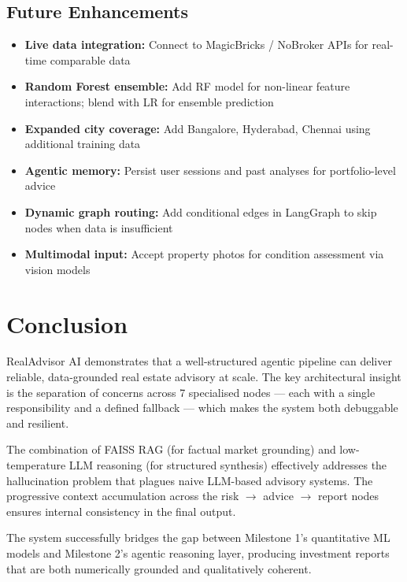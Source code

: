 \documentclass[12pt,a4paper]{article}
\begin{document}
\subsection{Future Enhancements}

\begin{itemize}[leftmargin=1.5em]
  \item \textbf{Live data integration:} Connect to MagicBricks / NoBroker APIs for real-time comparable data
  \item \textbf{Random Forest ensemble:} Add RF model for non-linear feature interactions; blend with LR for ensemble prediction
  \item \textbf{Expanded city coverage:} Add Bangalore, Hyderabad, Chennai using additional training data
  \item \textbf{Agentic memory:} Persist user sessions and past analyses for portfolio-level advice
  \item \textbf{Dynamic graph routing:} Add conditional edges in LangGraph to skip nodes when data is insufficient
  \item \textbf{Multimodal input:} Accept property photos for condition assessment via vision models
\end{itemize}

\section{Conclusion}

RealAdvisor AI demonstrates that a well-structured agentic pipeline can deliver reliable, data-grounded real estate advisory at scale. The key architectural insight is the separation of concerns across 7 specialised nodes --- each with a single responsibility and a defined fallback --- which makes the system both debuggable and resilient.

The combination of FAISS RAG (for factual market grounding) and low-temperature LLM reasoning (for structured synthesis) effectively addresses the hallucination problem that plagues naive LLM-based advisory systems. The progressive context accumulation across the risk $\rightarrow$ advice $\rightarrow$ report nodes ensures internal consistency in the final output.

The system successfully bridges the gap between Milestone 1's quantitative ML models and Milestone 2's agentic reasoning layer, producing investment reports that are both numerically grounded and qualitatively coherent.

\end{document}
